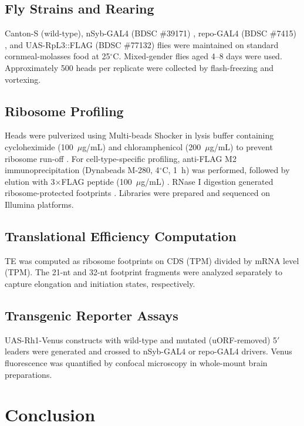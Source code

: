\documentclass[11pt]{article}
\begin{document}
\subsection{Fly Strains and Rearing}

Canton-S (wild-type), nSyb-GAL4 (BDSC \#39171) \citep{nsynbgal4_driver2010}, repo-GAL4 (BDSC \#7415) \citep{repo_gal4_2008}, and UAS-RpL3::FLAG (BDSC \#77132) flies were maintained on standard cornmeal-molasses food at 25$^{\circ}$C. Mixed-gender flies aged 4--8 days were used. Approximately 500 heads per replicate were collected by flash-freezing and vortexing.

\subsection{Ribosome Profiling}

Heads were pulverized using Multi-beads Shocker in lysis buffer containing cycloheximide (100~$\mu$g/mL) and chloramphenicol (200~$\mu$g/mL) to prevent ribosome run-off \citep{cycloheximide_2014}. For cell-type-specific profiling, anti-FLAG M2 immunoprecipitation (Dynabeads M-280, 4$^{\circ}$C, 1~h) was performed, followed by elution with 3$\times$FLAG peptide (100~$\mu$g/mL) \citep{trap_method2008}. RNase I digestion generated ribosome-protected footprints \citep{ingolia2009ribosome}. Libraries were prepared and sequenced on Illumina platforms.

\subsection{Translational Efficiency Computation}

TE was computed as ribosome footprints on CDS (TPM) divided by mRNA level (TPM). The 21-nt and 32-nt footprint fragments were analyzed separately to capture elongation and initiation states, respectively.

\subsection{Transgenic Reporter Assays}

UAS-Rh1-Venus constructs with wild-type and mutated (uORF-removed) 5$'$ leaders \citep{rhodopsin_drosophila1991, venus_fluorescent2004} were generated and crossed to nSyb-GAL4 or repo-GAL4 drivers. Venus fluorescence was quantified by confocal microscopy in whole-mount brain preparations.

\section{Conclusion}
\end{document}
